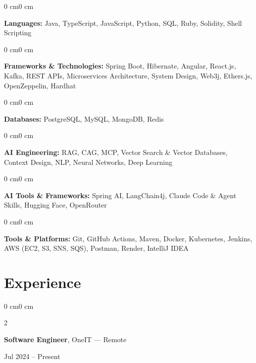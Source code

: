 \documentclass[10pt, letterpaper]{article}
\newenvironment{onecolentry}{
    \begin{adjustwidth}{0 cm}{0 cm}
}{
    \end{adjustwidth}
}
\newenvironment{twocolentry}[2][]{
    \onecolentry
    \def\secondColumn{#2}
    \setcolumnwidth{\fill, 4.5 cm}
    \begin{paracol}{2}
}{
    \switchcolumn \raggedleft \secondColumn
    \end{paracol}
    \endonecolentry
}
\begin{document}
    \begin{onecolentry}
        \textbf{Languages:} Java, TypeScript, JavaScript, Python, SQL, Ruby, Solidity, Shell Scripting
    \end{onecolentry}
    \vspace{0.08 cm}

    \begin{onecolentry}
        \textbf{Frameworks \& Technologies:} Spring Boot, Hibernate, Angular, React.js, Kafka, REST APIs, Microservices Architecture, System Design, Web3j, Ethers.js, OpenZeppelin, Hardhat
    \end{onecolentry}
    \vspace{0.08 cm}

    \begin{onecolentry}
        \textbf{Databases:} PostgreSQL, MySQL, MongoDB, Redis
    \end{onecolentry}
    \vspace{0.08 cm}

    \begin{onecolentry}
        \textbf{AI Engineering:} RAG, CAG, MCP, Vector Search \& Vector Databases, Context Design, NLP, Neural Networks, Deep Learning
    \end{onecolentry}
    \vspace{0.08 cm}

    \begin{onecolentry}
        \textbf{AI Tools \& Frameworks:} Spring AI, LangChain4j, Claude Code \& Agent Skills, Hugging Face, OpenRouter
    \end{onecolentry}
    \vspace{0.08 cm}

    \begin{onecolentry}
        \textbf{Tools \& Platforms:} Git, GitHub Actions, Maven, Docker, Kubernetes, Jenkins, AWS (EC2, S3, SNS, SQS), Postman, Render, IntelliJ IDEA
    \end{onecolentry}

    \section{Experience}

    \begin{twocolentry}{Jul 2024 -- Present}
        \textbf{Software Engineer}, OneIT --- Remote
    \end{twocolentry}
\end{document}
